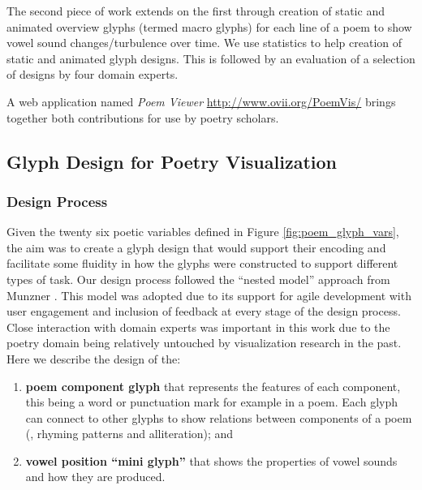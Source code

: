 The second piece of work extends on the first through creation of static and animated overview glyphs (termed macro glyphs) for each line of a poem to show vowel sound changes/turbulence over time.
We use statistics to help creation of static and animated glyph designs.
This is followed by an evaluation of a selection of designs by four domain experts.

A web application named \emph{Poem Viewer} \url{http://www.ovii.org/PoemVis/} brings together both contributions for use by poetry scholars.


\subsection{Glyph Design for Poetry Visualization}

\subsubsection{Design Process}

Given the twenty six poetic variables defined in Figure \ref{fig:poem_glyph_vars}, the aim was to create a glyph design that would support their encoding and facilitate some fluidity in how the glyphs were constructed to support different types of task.
Our design process followed the ``nested model'' approach from Munzner \cite{munzner2009nested}.
This model was adopted due to its support for agile development with user engagement and inclusion of feedback at every stage of the design process.
Close interaction with domain experts was important in this work due to the poetry domain being relatively untouched by visualization research in the past.
Here we describe the design of the: 
\begin{enumerate}
\item \textbf{poem component glyph} that represents the features of each component, this being a word or punctuation mark for example in a poem.
Each glyph can connect to other glyphs to show relations between components of a poem (\eg, rhyming patterns and alliteration); and 
\item \textbf{vowel position ``mini glyph''} that shows the properties of vowel sounds and how they are produced.
\end{enumerate}

